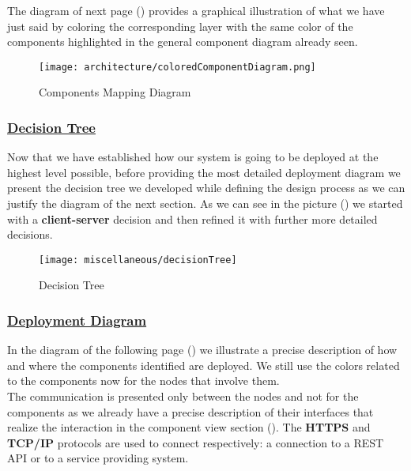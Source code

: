 		The diagram of next page () provides a graphical illustration of what we have just said by coloring the corresponding layer with the same color of the components highlighted in the general component diagram already seen.
		
		\newpage
		
		\begin{figure}[htbp]
			\centering
			\texttt{[image: architecture/coloredComponentDiagram.png]}
			\caption{\label{fig:coloredComponentDiagram} Components Mapping Diagram}
		\end{figure}
	
		\FloatBarrier
	
		\subsubsection[Decision Tree]{\hyperlink{toc}{Decision Tree}}
			\label{sec:decisionTree}
			
			Now that we have established how our system is going to be deployed at the highest level possible, before providing the most detailed deployment diagram we present the decision tree we developed while defining the design process as we can justify the diagram of the next section. As we can see in the picture () we started with a \textbf{client-server} decision and then refined it with further more detailed decisions.
			
			\begin{figure}[h!]
				\centering
				\texttt{[image: miscellaneous/decisionTree]}
				\caption{\label{fig:decisionTree} Decision Tree}
			\end{figure}
			
		\subsubsection[Deployment Diagram]{\hyperlink{toc}{Deployment Diagram}}
			\label{sec:deploymentDiagram}
			
			In the diagram of the following page () we illustrate a precise description of how and where the components identified are deployed. We still use the colors related to the components now for the nodes that involve them.\\
			
			The communication is presented only between the nodes and not for the components as we already have a precise description of their interfaces that realize the interaction in the component view section (). The \textbf{HTTPS} and \textbf{TCP/IP} protocols are used to connect respectively: a connection to a REST API or to a service providing system.\\
			
